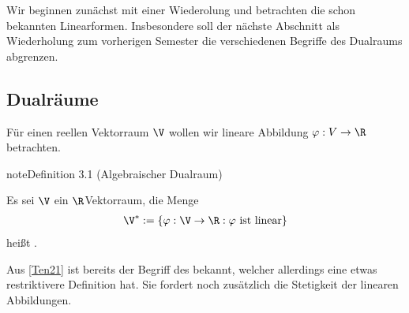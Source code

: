 \documentclass[letterpaper,10pt,english]{jupyterBook}
\begin{document}
\sphinxAtStartPar
Wir beginnen zunächst mit einer Wiederolung und betrachten die schon bekannten Linearformen. Insbesondere soll der nächste Abschnitt als Wiederholung zum vorherigen Semester die verschiedenen Begriffe des Dualraums abgrenzen.


\subsection{Dualräume}
\label{\detokenize{vektoranalysis/multilinear:dualraume}}
\sphinxAtStartPar
Für einen reellen Vektorraum \(\V\) wollen wir lineare Abbildung \(\varphi:V\to\R\) betrachten.
\label{vektoranalysis/multilinear:definition-0}
\begin{sphinxadmonition}{note}{Definition 3.1 (Algebraischer Dualraum)}



\sphinxAtStartPar
Es sei \(\V\) ein \(\R\)\sphinxhyphen{}Vektorraum, die Menge
\begin{equation*}
\begin{split}\V^\ast := \{\varphi:\V\rightarrow\R: \varphi\text{ ist linear}\}\end{split}
\end{equation*}
\sphinxAtStartPar
heißt .
\end{sphinxadmonition}

\sphinxAtStartPar
Aus {[}\hyperlink{cite.references:id12}{Ten21}{]} ist bereits der Begriff des  bekannt, welcher allerdings eine etwas restriktivere Definition hat. Sie fordert noch zusätzlich die Stetigkeit der linearen Abbildungen.
\end{document}
